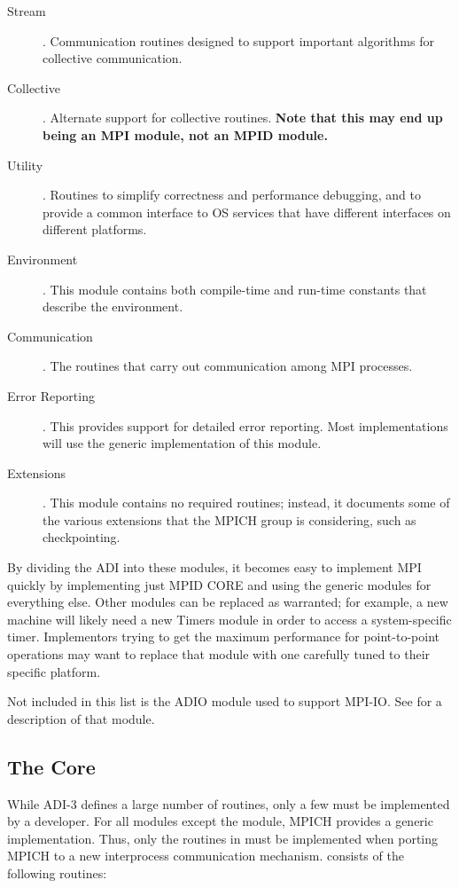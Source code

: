 \documentclass{article}
\begin{document}
\begin{description}
\item[Stream]. Communication routines designed to support
important algorithms for collective communication.
\item[Collective]. Alternate support for collective
routines. \textbf{Note that this may end up being an MPI module, not
an MPID module.}
\item[Utility]. Routines to simplify correctness and performance
debugging, and to provide a common interface to OS services that have
different interfaces on different platforms.
\item[Environment]. This module contains both compile-time and run-time
constants that describe the environment. 
\item[Communication]. The routines that carry out communication among MPI
  processes. 
\item[Error Reporting]. This provides support for detailed error
reporting.  Most implementations will use the generic implementation
of this module.
\item[Extensions]. This module contains no required routines; instead,
it documents some of the various extensions that the MPICH group is
considering, such as checkpointing.
\end{description}

By dividing the ADI into these modules, it becomes easy to implement
MPI quickly by implementing just MPID CORE and using the generic
modules for everything else.  Other modules can be replaced as
warranted; for example, a new machine will likely need a new Timers
module in order to access a system-specific timer.  Implementors
trying to get the maximum performance for point-to-point operations
may want to replace that module with one carefully tuned to their
specific platform.

Not included in this list is the ADIO module used to support MPI-IO.
See \cite{romio-adio-manual} for a description of that module.

\subsection{The Core}
\label{sec-minimal}

While ADI-3 defines a large number of routines, only a few must be implemented
by a developer.  For all modules except the  module, MPICH
provides a generic implementation.  Thus, only the routines in
 must be implemented when porting MPICH to a new interprocess
communication mechanism.   consists of the following routines: 
\end{document}
